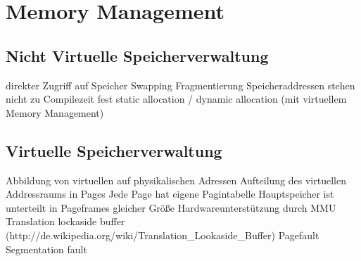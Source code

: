 \section{Memory Management}

\subsection*{Nicht Virtuelle Speicherverwaltung}

        direkter Zugriff auf Speicher
        Swapping
        Fragmentierung
        Speicheraddressen stehen nicht zu Compilezeit fest
        static allocation / dynamic allocation
     (mit virtuellem Memory Management)



\subsection*{Virtuelle Speicherverwaltung}

        Abbildung von virtuellen auf physikalischen Adressen
        Aufteilung des virtuellen Addressraums in Pages
        Jede Page hat eigene Pagintabelle
        Hauptspeicher ist unterteilt in Pageframes gleicher Größe
        Hardwareunterstützung durch MMU
        Translation lockaside buffer (http://de.wikipedia.org/wiki/Translation_Lookaside_Buffer)
        Pagefault
        Segmentation fault



